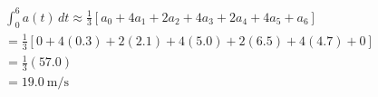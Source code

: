 \documentclass[preview]{standalone}
\begin{document}
\begin{align*}
\int_0^{6} a(t)\,dt \approx \frac{1}{3}\left[ a_0 + 4a_1 + 2a_2 + 4a_3 + 2a_4 + 4a_5 + a_6 \right] \\[4pt] = \frac{1}{3} \left[ 0 + 4(0.3) + 2(2.1) + 4(5.0) + 2(6.5) + 4(4.7) + 0 \right] \\[4pt] = \frac{1}{3}(57.0) \\[4pt] = 19.0\ \text{m/s}
\end{align*}
\end{document}
